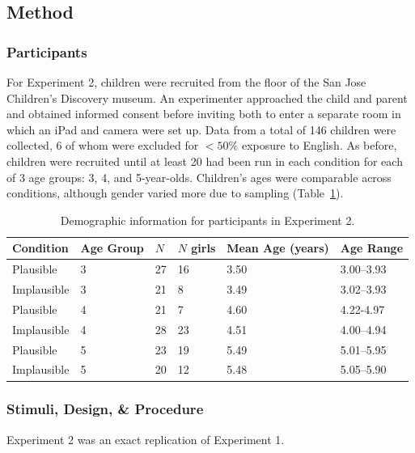 \documentclass[man,floatsintext]{apa6}
\begin{document}
\subsection{Method}

\subsubsection{Participants}

For Experiment 2, children were recruited from the floor of the San Jose Children's Discovery museum. An experimenter approached the child and parent and obtained informed consent before inviting both to enter a separate room in which an iPad and camera were set up. Data from a total of 146 children were collected, 6 of whom were excluded for $<50\%$ exposure to English. As before, children were recruited until at least 20 had been run in each condition for each of 3 age groups: 3, 4, and 5-year-olds. Children's ages were comparable across conditions, although gender varied more due to sampling (Table~\ref{tab:exp2_demos}).

\begin{table}[tb]
\begin{center}
\begin{tabular}{llllll}
 Condition & Age Group & $N$ & $N$ girls & Mean Age (years) & Age Range\\ 
  \hline
  Plausible & 3 & 27 & 16 & 3.50 & 3.00--3.93 \\ 
  Implausible & 3 & 21 & 8 & 3.49 & 3.02--3.93 \\ 
  Plausible & 4 & 21 & 7 & 4.60 & 4.22-4.97 \\ 
  Implausible & 4 & 28 & 23 & 4.51 & 4.00--4.94 \\ 
  Plausible & 5 & 23 & 19 & 5.49 & 5.01--5.95 \\ 
  Implausible & 5 & 20 & 12 & 5.48 & 5.05--5.90 \\ 
   \hline
\end{tabular}\end{center}
\vspace{6pt}
\caption{\label{tab:exp2_demos}Demographic information for participants in Experiment 2.}
\end{table}

\subsubsection{Stimuli, Design, \& Procedure}

Experiment 2 was an exact replication of Experiment 1.
\end{document}
